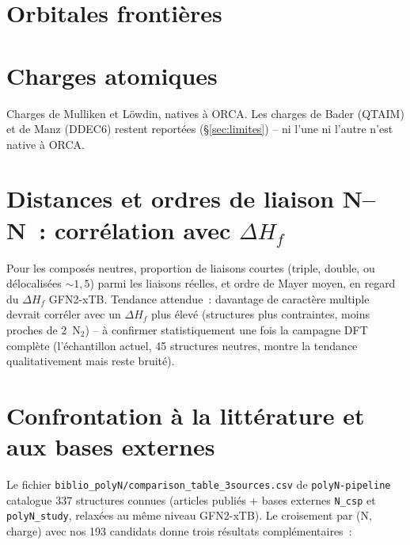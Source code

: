 \documentclass[11pt,a4paper]{article}
\begin{document}
\section{Orbitales fronti\`eres}



\section{Charges atomiques}

Charges de Mulliken et L\"owdin, natives \`a ORCA. Les charges de Bader
(QTAIM) et de Manz (DDEC6) restent report\'ees (\S\ref{sec:limites}) --
ni l'une ni l'autre n'est native \`a ORCA.



\section{Distances et ordres de liaison N--N~: corr\'elation avec $\Delta H_f$}
\label{sec:bonds}

Pour les compos\'es neutres, proportion de liaisons courtes (triple,
double, ou d\'elocalis\'ees ${\sim}1{,}5$) parmi les liaisons r\'eelles, et
ordre de Mayer moyen, en regard du $\Delta H_f$ GFN2-xTB. Tendance
attendue~: davantage de caract\`ere multiple devrait corr\'eler avec un
$\Delta H_f$ plus \'elev\'e (structures plus contraintes, moins proches de
2~N$_2$) -- \`a confirmer statistiquement une fois la campagne DFT
compl\`ete (l'\'echantillon actuel, 45 structures neutres, montre la
tendance qualitativement mais reste bruit\'e).



\section{Confrontation \`a la litt\'erature et aux bases externes}
\label{sec:litterature}

Le fichier \texttt{biblio\_polyN/comparison\_table\_3sources.csv} de
\texttt{polyN-pipeline} catalogue 337 structures connues (articles publi\'es
+ bases externes \texttt{N\_csp} et \texttt{polyN\_study}, relax\'ees au
m\^eme niveau GFN2-xTB). Le croisement par (N, charge) avec nos 193
candidats donne trois r\'esultats compl\'ementaires~:
\end{document}
